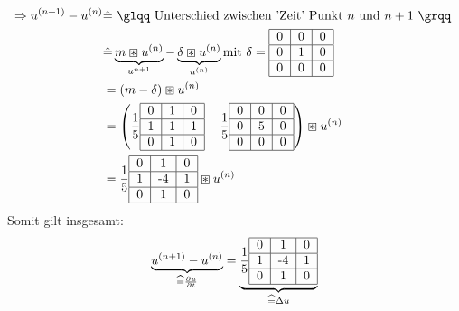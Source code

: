 \documentclass{article}
\theoremstyle{plain}
\theoremstyle{definition}
\numberwithin{equation}{section}
\newcommand{\quo}[1] {
\glqq #1 \grqq
}
\begin{document}
    \begin{align*}
        \Rightarrow u^{(n+1)} - u^{(n)} & \hat = \text{\quo{Unterschied zwischen 'Zeit' Punkt $n$ und $n+1$}}\\
        & \hat = \underbrace{m \boxast u^{(n)}}_{u^{n+1}} - \underbrace{\delta \boxast u^{(n)}}_{u^{(n)}} \text{mit } \delta = \begin{tabular}{|c|c|c|}
            \hline
            0 & 0 & 0\\
            \hline
            0 & 1 & 0\\
            \hline
            0 & 0 & 0\\
            \hline
        \end{tabular}\\
        &=(m - \delta) \boxast u^{(n)}\\
        &=\left( \frac{1}{5}\begin{tabular}{|c|c|c|}
            \hline
            0 & 1 & 0\\
            \hline
            1 & 1 & 1\\
            \hline
            0 & 1 & 0\\
            \hline
        \end{tabular} - \frac{1}{5} \begin{tabular}{|c|c|c|}
            \hline
            0 & 0 & 0\\
            \hline
            0 & 5 & 0\\
            \hline
            0 & 0 & 0\\
            \hline
        \end{tabular}\right) \boxast u^{(n)}\\
        &= \frac{1}{5} \begin{tabular}{|c|c|c|}
            \hline
            0 & 1 & 0\\
            \hline
            1 & -4 & 1\\
            \hline
            0 & 1 & 0\\
            \hline
        \end{tabular} \boxast u^{(n)}
    \end{align*} 
    Somit gilt insgesamt:
    \begin{equation}\label{eq:5.11}
        \underbrace{u^{(n+1)} - u^{(n)}}_{\widehat = \frac{\partial u}{\partial t}} = \underbrace{\frac{1}{5} \begin{tabular}{|c|c|c|}
            \hline
            0 & 1 & 0\\
            \hline
            1 & -4 & 1\\
            \hline
            0 & 1 & 0\\
            \hline
        \end{tabular}}_{\widehat = \Delta u}
    \end{equation}
\end{document}
